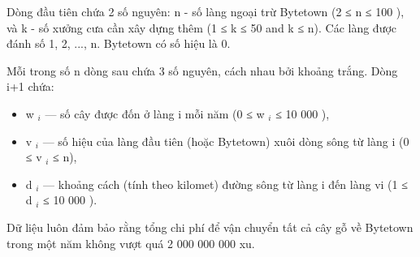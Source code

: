 Dòng đầu tiên chứa 2 số nguyên: n - số làng ngoại trừ Bytetown (2 ≤ n ≤ 100 ), và k - số xưởng cưa cần xây dựng thêm (1 ≤ k ≤ 50 and k ≤ n). Các làng được đánh số 1, 2, ..., n. Bytetown có số hiệu là 0.  

   Mỗi trong số n dòng sau chứa 3 số nguyên, cách nhau bởi khoảng trắng. Dòng i+1 chứa:  
\begin{itemize}
	\item     w    $_     i    $    — số cây được đốn ở làng i mỗi năm (0 ≤ w    $_     i    $    ≤ 10 000 ),   
	\item     v    $_     i    $    — số hiệu của làng đầu tiên (hoặc Bytetown) xuôi dòng sông từ làng i (0 ≤ v    $_     i    $    ≤ n),   
	\item     d    $_     i    $    — khoảng cách (tính theo kilomet) đường sông từ làng i đến làng vi (1 ≤ d    $_     i    $    ≤ 10 000 ).   
\end{itemize}

   Dữ liệu luôn đảm bảo rằng tổng chi phí để vận chuyển tất cả cây gỗ về Bytetown trong một năm không vượt quá 2 000 000 000 xu.